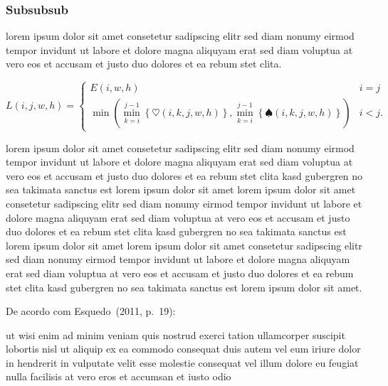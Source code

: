 \subsubsection{Subsubsub}

lorem ipsum dolor sit amet consetetur sadipscing elitr sed diam nonumy
eirmod tempor invidunt ut labore et dolore magna aliquyam erat sed diam
voluptua at vero eos et accusam et justo duo dolores et ea rebum
stet clita.~\cite{GOLDENBERGAPL02}

\begin{equation}\label{eq:apl}%
    L\left(i,j,w,h\right)=
    \begin{cases}
      E\left(i,w,h\right) & i=j\\
      \min\left(\min_{k=i}^{j-1}\left\{\heartsuit\left(i,k,j,w,h\right)\right\},
                \min_{k=i}^{j-1}\left\{\spadesuit\left(i,k,j,w,h\right)\right\}\right) & i<j\text{.}
    \end{cases}
\end{equation}

lorem ipsum dolor sit amet consetetur sadipscing elitr sed diam nonumy
eirmod tempor invidunt ut labore et dolore magna aliquyam erat sed diam
voluptua at vero eos et accusam et justo duo dolores et ea rebum stet clita
kasd gubergren no sea takimata sanctus est lorem ipsum dolor sit amet lorem
ipsum dolor sit amet consetetur sadipscing elitr sed diam nonumy eirmod
tempor invidunt ut labore et dolore magna aliquyam erat sed diam voluptua at
vero eos et accusam et justo duo dolores et ea rebum stet clita kasd
gubergren no sea takimata sanctus est lorem ipsum dolor sit amet lorem ipsum
dolor sit amet consetetur sadipscing elitr sed diam nonumy eirmod tempor
invidunt ut labore et dolore magna aliquyam erat sed diam voluptua at vero
eos et accusam et justo duo dolores et ea rebum stet clita kasd gubergren no
sea takimata sanctus est lorem ipsum dolor sit amet.

%
De acordo com Esquedo~(2011, p.~19):

\begin{directcite}
ut wisi enim ad minim veniam quis nostrud exerci tation ullamcorper suscipit
lobortis nisl ut aliquip ex ea commodo consequat duis autem vel eum iriure
dolor in hendrerit in vulputate velit esse molestie consequat vel illum
dolore eu feugiat nulla facilisis at vero eros et accumsan et
iusto odio
\end{directcite}

